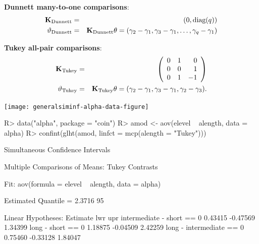\documentclass[landscape]{slides}
\begin{document}
\textbf{Dunnett many-to-one comparisons}:
\begin{eqnarray*}
\mathbf{K}_\text{Dunnett} &=& (0, \text{diag}(q)) \\
\vartheta_\text{Dunnett} &=& \mathbf{K}_\text{Dunnett} \theta = (\gamma_2 - \gamma_1, \gamma_3 - \gamma_1,
\dots, \gamma_q - \gamma_1)
\end{eqnarray*}

\textbf{Tukey all-pair comparisons}:
\begin{eqnarray*}
\K_\text{Tukey} &=& \left(
\begin{array}{rrr}
0 & 1 & 0 \\ 
0 & 0 & 1 \\ 
0 & 1 & -1%
\end{array}  
\right) \\
\vartheta_\text{Tukey} &=& \K_\text{Tukey} \theta = (\gamma_2 - \gamma_1, \gamma_3 - \gamma_1,
\gamma_2 - \gamma_3).
\end{eqnarray*}


\begin{center}   
\texttt{[image: generalsiminf-alpha-data-figure]}
\end{center}

\newpage

\begin{Schunk}
\begin{Sinput}
R> data("alpha", package = "coin")   
R> amod <- aov(elevel ~ alength, data = alpha)
R> confint(glht(amod, linfct = mcp(alength = "Tukey")))
\end{Sinput}
\begin{Soutput}
	 Simultaneous Confidence Intervals

Multiple Comparisons of Means: Tukey Contrasts


Fit: aov(formula = elevel ~ alength, data = alpha)

Estimated Quantile = 2.3716
95%
 

Linear Hypotheses:
                          Estimate lwr      upr     
intermediate - short == 0  0.43415 -0.47569  1.34399
long - short == 0          1.18875 -0.04509  2.42259
long - intermediate == 0   0.75460 -0.33128  1.84047
\end{Soutput}
\end{Schunk}

\newpage
\end{document}

